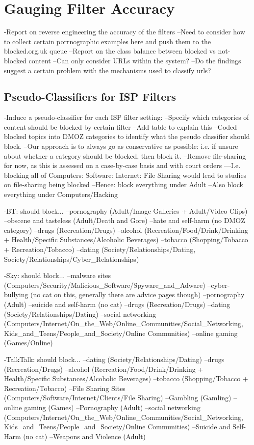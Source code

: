 \documentclass{bmcart}
\begin{document}
\clearpage
\section*{Gauging Filter Accuracy}
-Report on reverse engineering the accuracy of the filters
--Need to consider how to collect certain porrnographic examples here and push them to the blocked.org.uk queue
--Report on the class balance between blocked vs not-blocked content
--Can only consider URLs within the system?
--Do the findings suggest a certain problem with the mechanisms used to classify urls?

\subsection*{Pseudo-Classifiers for ISP Filters}
-Induce a pseudo-classifier for each ISP filter setting:
--Specify which categories of content should be blocked by certain filter
--Add table to explain this
--Coded blocked topics into DMOZ categories to identify what the pseudo classifier should block. 
--Our approach is to always go as conservative as possible: i.e. if unsure about whether a category should be blocked, then block it.
--Remove file-sharing for now, as this is assessed on a case-by-case basis and with court orders
---I.e. blocking all of Computers: Software: Internet: File Sharing would lead to studies on file-sharing being blocked
--Hence: block everything under Adult
--Also block everything under Computers/Hacking

-BT: should block...
--pornography (Adult/Image Galleries + Adult/Video Clips)
--obscene and tasteless (Adult/Death and Gore)
--hate and self-harm (no DMOZ category)
--drugs (Recreation/Drugs)
--alcohol (Recreation/Food/Drink/Drinking + Health/Specific Substances/Alcoholic Beverages)
--tobacco (Shopping/Tobacco + Recreation/Tobacco)
--dating (Society/Relationships/Dating, Society/Relationships/Cyber\_Relationships)

-Sky: should block...
--malware sites (Computers/Security/Malicious\_Software/Spyware\_and\_Adware)
--cyber-bullying (no cat on this, generally there are advice pages though)
--pornography (Adult)
--suicide and self-harm (no cat)
--drugs (Recreation/Drugs)
--dating (Society/Relationships/Dating)
--social networking (Computers/Internet/On\_the\_Web/Online\_Communities/Social\_Networking, Kids\_and\_Teens/People\_and\_Society/Online Communities)
--online gaming (Games/Online)

-TalkTalk: should block...
--dating (Society/Relationships/Dating)
--drugs (Recreation/Drugs)
--alcohol (Recreation/Food/Drink/Drinking + Health/Specific Substances/Alcoholic Beverages)
--tobacco (Shopping/Tobacco + Recreation/Tobacco)
--File Sharing Sites (Computers/Software/Internet/Clients/File Sharing)
--Gambling (Gamling)
--online gaming (Games)
--Pornography (Adult)
--social networking (Computers/Internet/On\_the\_Web/Online\_Communities/Social\_Networking, Kids\_and\_Teens/People\_and\_Society/Online Communities)
--Suicide and Self-Harm (no cat)
--Weapons and Violence (Adult)
\end{document}

